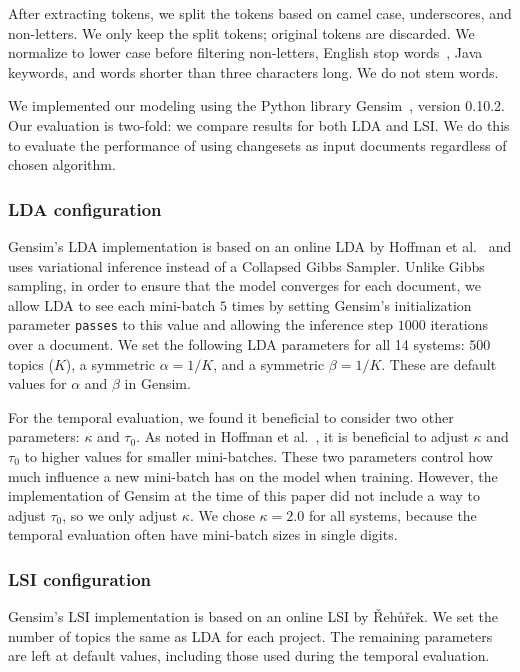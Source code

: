 After extracting tokens, we split the tokens based on camel case,
underscores, and non-letters.
We only keep the split tokens; original tokens are discarded.
We normalize to lower case before filtering non-letters, English stop words~\cite{StopWords}, Java keywords, and words shorter than three characters long.
We do not stem words.

We implemented our modeling using the Python library Gensim~\cite{Gensim}, version 0.10.2.
Our evaluation is two-fold: we compare results for both LDA and LSI.
We do this to evaluate the performance of using changesets as input
documents regardless of chosen algorithm.

\subsubsection{LDA configuration}

Gensim's LDA implementation is based on an online LDA by Hoffman et al.~\cite{Hoffman-etal:2010}
and uses variational inference instead of a Collapsed Gibbs Sampler.
Unlike Gibbs sampling, in order to ensure that the model converges for each document,
we allow LDA to see each mini-batch $5$ times by setting Gensim's initialization parameter \texttt{passes} to this value
and allowing the inference step $1000$ iterations over a document.
We set the following LDA parameters for all 14 systems:
$500$ topics ($K$), a symmetric $\alpha=1/K$, and a symmetric $\beta=1/K$.
These are default values for $\alpha$ and $\beta$ in Gensim.

For the temporal evaluation, we found it beneficial to consider two other parameters: $\kappa$ and $\tau_0$.
As noted in Hoffman et al.~\cite{Hoffman-etal:2010}, it is beneficial to
adjust $\kappa$ and $\tau_0$ to higher values for smaller mini-batches.
These two parameters control how much influence a new mini-batch has on the model when training.
However, the implementation of Gensim at the time of this paper did not
include a way to adjust $\tau_0$, so we only adjust $\kappa$.
We chose $\kappa=2.0$ for all systems, because the temporal evaluation
often have mini-batch sizes in single digits.

\subsubsection{LSI configuration}

Gensim's LSI implementation is based on an online LSI by {\v R}eh{\r u}{\v r}ek\cite{Radim:2011}.
We set the number of topics the same as LDA for each project.
The remaining parameters are left at default values, including those used
during the temporal evaluation.


